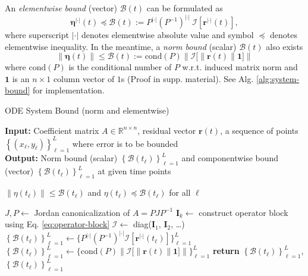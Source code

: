 \documentclass[accepted]{uai2023}
\newcommand{\vect}[1]{\mathbf{#1}}
\newcommand{\Err}{\eta}
\newcommand{\Bound}{\mathcal{B}}
\newcommand{\I}{\mathcal{I}}
\newcommand{\abs}{|\cdot|}
\begin{document}
    An \textit{elementwise bound} (vector) $\pmb{\Bound}(t)$ can be formulated as 
    {
        \small
        \begin{equation}
            \pmb{\Err}^{\abs}(t) \preceq \pmb{\Bound}(t) := P^{\abs} (P^{-1})^{\abs} \ \pmb{\I}\left[\vect{r}^{\abs}(t)\right],
        \end{equation}
    }
    where superscript $\abs$ denotes elementwise absolute value and symbol $\preceq$ denotes elementwise inequality. In the meantime, a \textit{norm bound} (scalar) $\Bound(t)$ also exists
    {
        \small
        \begin{equation}
            \left\|\pmb{\Err}(t)\right\| \leq \Bound(t) := \mathrm{cond}(P)\left\|\pmb{\I}\Big[\|\vect{r}(t)\|\vect{1}\Big]\right\|
        \end{equation}
    }
    where $\mathrm{cond}(P)$ is the conditional number of $P$ w.r.t. induced matrix norm and $\vect{1}$ is an $n\times 1$ column vector of $1$s (Proof in supp. material).
    See Alg. \ref{alg:system-bound} for implementation.

    \begin{algorithm}
        \small
        \caption{ODE System Bound (norm and elementwise)}\label{alg:system-bound}
        \textbf{Input:} Coefficient matrix $A \in \mathbb{R}^{n\times n}$, residual vector $\vect{r}(t)$, a sequence of points $\left\{(x_\ell, y_\ell)\right\}_{\ell=1}^{L}$ where error is to be bounded\\
        \textbf{Output:} Norm bound (scalar) $\left\{\Bound(t_\ell)\right\}_{\ell=1}^{L}$ and componentwise bound (vector) $\left\{\pmb{\Bound}(t_\ell)\right\}_{\ell=1}^{L}$ at given time points
        \begin{algorithmic}
            \Ensure $\|\Err(t_\ell)\| \leq \Bound(t_\ell)$ and $\Err(t_\ell) \preceq \pmb{\Bound}(t_\ell)$ for all $\ell$

            \State $J, P \gets $ Jordan canonicalization of $A = PJP^{-1}$
                \State $\vect{I}_k \gets$ construct operator block using Eq. \ref{eq:operator-block} 
            \EndFor
            \State $\pmb{\I} \gets$ diag($\vect{I}_1$, $\vect{I}_2$,  \dots)
            \State $\left\{\pmb{\Bound}(t_\ell)\right\}_{\ell=1}^{L} \gets \{P^{\abs} (P^{-1})^{\abs} \pmb{\I}[\vect{r}^{\abs}(t_\ell)]\}_{\ell=1}^{L}$
            \State $\left\{\Bound(t_\ell)\right\}_{\ell=1}^{L} \gets \{\mathrm{cond}(P)\left\|\pmb{\I}\big[\|\vect{r}(t)\|\vect{1}\big]\right\|\}_{\ell=1}^{L}$
            \State \textbf{return} $\left\{\Bound(t_\ell)\right\}_{\ell=1}^{L}$, $\left\{\pmb{\Bound}(t_\ell)\right\}_{\ell=1}^{L}$
        \end{algorithmic}
    \end{algorithm}
\end{document}
